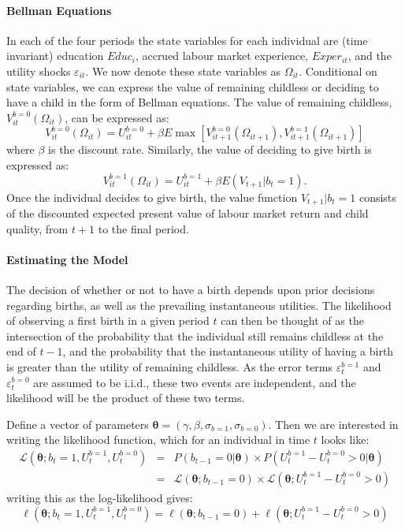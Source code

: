 \documentclass[a4paper, 11 pt]{article}
\theoremstyle{plain}
\begin{document}
\begin{spacing}{1.4}
\paragraph{Bellman Equations} In each of the four periods the state variables
for each individual are (time invariant) education $Educ_i$, accrued labour 
market experience, $Exper_{it}$, and the utility shocks $\varepsilon_{it}$.  
We now denote these state variables as $\Omega_{it}$.  Conditional on state 
variables, we can express the value of remaining childless or deciding to have 
a child in the form of Bellman equations.  The value of remaining childless, 
$V_{it}^{b=0}(\Omega_{it})$, can be expressed as:
\begin{equation}
\label{beEqn:VF0}
V_{it}^{b=0}(\Omega_{it})=U_{it}^{b=0}+\beta E\max
                         [V_{it+1}^{b=0}(\Omega_{it+1}),V_{it+1}^{b=1}(\Omega_{it+1})]
\end{equation}
where $\beta$ is the discount rate.  Similarly, the value of deciding to
give birth is expressed as:
\begin{equation}
\label{beEqn:VF1}
V_{it}^{b=1}(\Omega_{it})=U_{it}^{b=1}+\beta E(V_{t+1}|b_t=1).
\end{equation}
Once the individual decides to give birth, the value function $V_{t+1}|b_t=1$
consists of the discounted expected present value of labour market return and 
child quality, from $t+1$ to the final period.

\paragraph{Estimating the Model}
The decision of whether or not to have a birth depends upon prior decisions 
regarding births, as well as the prevailing instantaneous utilities.  The
likelihood of observing a first birth in a given period $t$ can then be thought 
of as the intersection of the probability that the individual still remains 
childless at the end of $t-1$, and the probability that the instantaneous 
utility of having a birth is greater than the utility of remaining childless. As 
the error terms $\varepsilon_t^{b=1}$ and $\varepsilon_t^{b=0}$ are assumed to 
be i.i.d., these two events are independent, and the likelihood will be the 
product of these two terms.

Define a vector of parameters $\bm\theta=(\gamma,\beta,\sigma_{b=1},
\sigma_{b=0})$. Then we are interested in writing the likelihood function, which 
for an individual in time $t$ looks like:
\begin{eqnarray}
\mathcal{L}(\bm\theta;b_t=1,U_t^{b=1},U_t^{b=0})&=&
P(b_{t-1}=0|\bm\theta) \times P(U_t^{b=1}-U_t^{b=0}>0|\bm\theta) \nonumber \\
& = & \mathcal{L}(\bm\theta;b_{t-1}=0)\times 
\mathcal{L}(\bm\theta;U_t^{b=1}-U_t^{b=0}>0) \nonumber
\end{eqnarray}
writing this as the log-likelihood gives:
\begin{equation}
\ell(\bm\theta;b_t=1,U_t^{b=1},U_t^{b=0})= \ell(\bm\theta;b_{t-1}=0) 
+ \ell(\bm\theta;U_t^{b=1}-U_t^{b=0}>0)
\end{equation}


\end{spacing}
\end{document}

